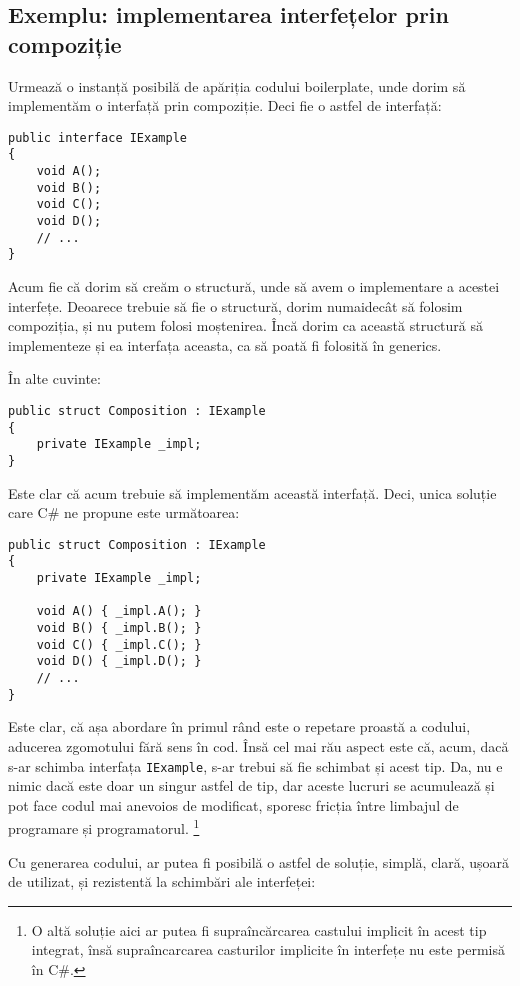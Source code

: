 \documentclass[a4paper,12pt]{report}
\begin{document}
\subsection{Exemplu: implementarea interfețelor prin compoziție}

Urmează o instanță posibilă de apăriția codului boilerplate, unde dorim să implementăm o interfață prin compoziție\cite{composition_interface_boilerplate}.
Deci fie o astfel de interfață:

\begin{verbatim}
public interface IExample
{
    void A();
    void B();
    void C();
    void D();
    // ...
}
\end{verbatim}

Acum fie că dorim să creăm o structură, unde să avem o implementare a acestei interfețe.
Deoarece trebuie să fie o structură, dorim numaidecât să folosim compoziția, și nu putem folosi moștenirea.
Încă dorim ca această structură să implementeze și ea interfața aceasta, ca să poată fi folosită în generics.

În alte cuvinte:

\begin{verbatim}
public struct Composition : IExample
{
    private IExample _impl;
}
\end{verbatim}

Este clar că acum trebuie să implementăm această interfață.
Deci, unica soluție care C\# ne propune este următoarea:

\begin{verbatim}
public struct Composition : IExample
{
    private IExample _impl;

    void A() { _impl.A(); }
    void B() { _impl.B(); }
    void C() { _impl.C(); }
    void D() { _impl.D(); }
    // ...
}
\end{verbatim}

Este clar, că așa abordare în primul rând este o repetare proastă a codului, aducerea zgomotului fără sens în cod.
Însă cel mai rău aspect este că, acum, dacă s-ar schimba interfața \texttt{IExample}, s-ar trebui să fie schimbat și acest tip.
Da, nu e nimic dacă este doar un singur astfel de tip, dar aceste lucruri se acumulează și pot face codul mai anevoios de modificat, sporesc fricția între limbajul de programare și programatorul. \footnote{
  O altă soluție aici ar putea fi supraîncărcarea castului implicit în acest tip integrat,
  însă supraîncarcarea casturilor implicite în interfețe nu este permisă în C\#.
}

Cu generarea codului, ar putea fi posibilă o astfel de soluție, simplă, clară, ușoară de utilizat, și rezistentă la schimbări ale interfeței:
\end{document}
